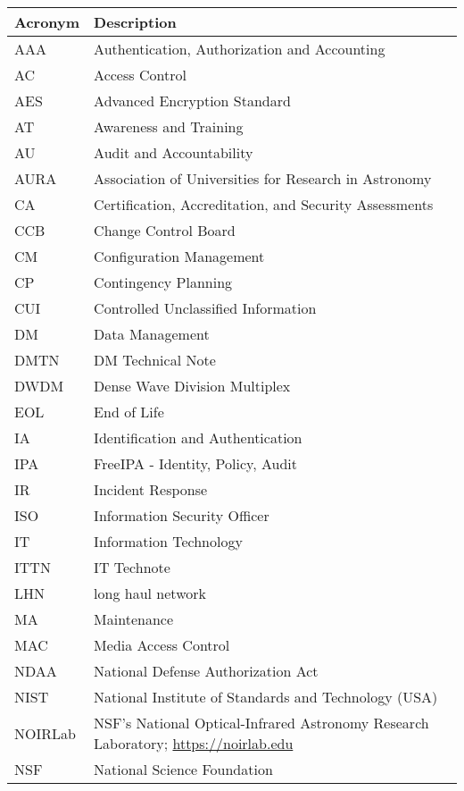 \addtocounter{table}{-1}
\begin{longtable}{p{}p{}}\hline
\textbf{Acronym} & \textbf{Description}  \\\hline

AAA & Authentication, Authorization and Accounting \\\hline
AC & Access Control \\\hline
AES & Advanced Encryption Standard \\\hline
AT & Awareness and Training \\\hline
AU & Audit and Accountability \\\hline
AURA & Association of Universities for Research in Astronomy \\\hline
CA & Certification, Accreditation, and Security Assessments \\\hline
CCB & Change Control Board \\\hline
CM & Configuration Management \\\hline
CP & Contingency Planning \\\hline
CUI & Controlled Unclassified Information \\\hline
DM & Data Management \\\hline
DMTN & DM Technical Note \\\hline
DWDM & Dense Wave Division Multiplex \\\hline
EOL & End of Life \\\hline
IA & Identification and Authentication \\\hline
IPA & FreeIPA - Identity, Policy, Audit \\\hline
IR & Incident Response \\\hline
ISO & Information Security Officer \\\hline
IT & Information Technology \\\hline
ITTN & IT Technote \\\hline
LHN & long haul network \\\hline
MA & Maintenance \\\hline
MAC & Media Access Control \\\hline
NDAA & National Defense Authorization Act \\\hline
NIST & National Institute of Standards and Technology (USA) \\\hline
NOIRLab & NSF's National Optical-Infrared Astronomy Research Laboratory; \url{https://noirlab.edu} \\\hline
NSF & National Science Foundation \\\hline

\end{longtable}
